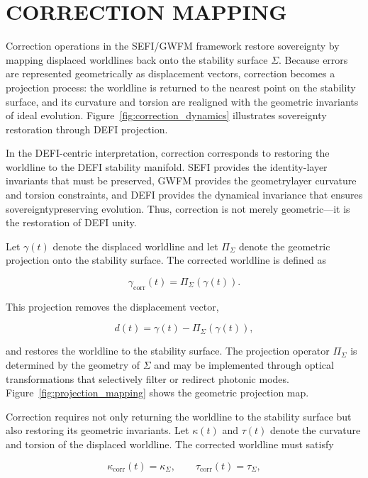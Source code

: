 \documentclass[aip,adv,reprint,floatfix]{revtex4-2}
\begin{document}
\section{CORRECTION MAPPING}

Correction operations in the SEFI/GWFM framework
restore sovereignty by mapping displaced worldlines back
onto the stability surface $\Sigma$.\cite{DuttonSEFI2026,DuttonElectronField2026}
Because errors are represented geometrically as displacement vectors, correction
becomes a projection process: the worldline is returned
to the nearest point on the stability surface, and its curvature and torsion are realigned with the geometric invariants of ideal evolution. Figure~\ref{fig:correction_dynamics}
illustrates sovereignty restoration through DEFI projection.

In the DEFI-centric interpretation, correction corresponds to restoring the worldline to the DEFI stability manifold.\cite{DuttonSEFI2026} SEFI provides the identity-layer invariants
that must be preserved, GWFM provides the geometrylayer curvature and torsion constraints, and DEFI provides the dynamical invariance that ensures sovereigntypreserving evolution. Thus, correction is not merely geometric—it is the restoration of DEFI unity.

Let $\gamma(t)$ denote the displaced worldline and let $\Pi_{\Sigma}$ denote the geometric projection onto the stability surface.
The corrected worldline is defined as


\[
\gamma_{\mathrm{corr}}(t) = \Pi_{\Sigma}(\gamma(t)).
\]


This projection removes the displacement vector,


\[
d(t) = \gamma(t) - \Pi_{\Sigma}(\gamma(t)),
\]


and restores the worldline to the stability surface.\cite{DuttonElectronField2026}
The projection operator $\Pi_{\Sigma}$ is determined by the geometry of
$\Sigma$ and may be implemented through optical transformations that selectively filter or redirect photonic modes.
Figure~\ref{fig:projection_mapping} shows the geometric projection map.

Correction requires not only returning the worldline
to the stability surface but also restoring its geometric
invariants. Let $\kappa(t)$ and $\tau(t)$ denote the curvature and
torsion of the displaced worldline. The corrected worldline must satisfy


\[
\kappa_{\mathrm{corr}}(t) = \kappa_{\Sigma}, \qquad \tau_{\mathrm{corr}}(t) = \tau_{\Sigma},
\]
\end{document}
